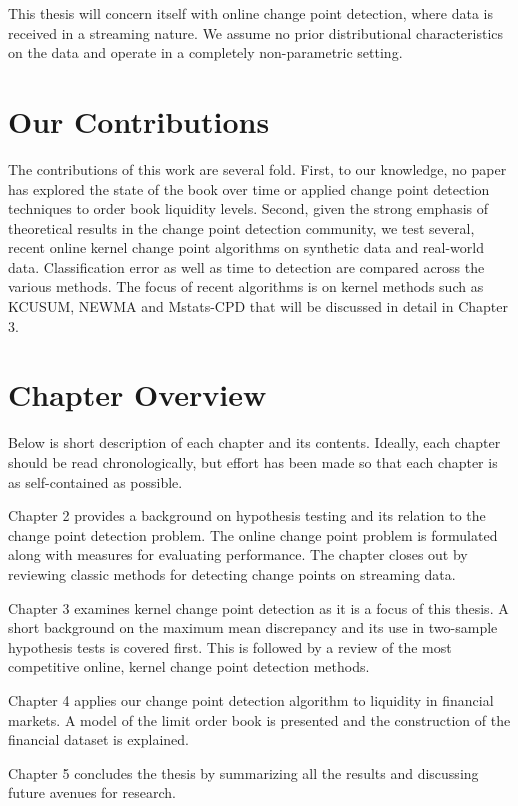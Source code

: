 This thesis will concern itself with online change point detection, where data is received in a streaming nature. We assume no prior distributional characteristics on the data and operate in a completely non-parametric setting. 


\section{Our Contributions}
The contributions of this work are several fold. First, to our knowledge, no paper has explored the state of the book over time or applied change point detection techniques to order book liquidity levels. Second, given the strong emphasis of theoretical results in the change point detection community, we test several, recent online kernel change point algorithms on synthetic data and real-world data. Classification error as well as time to detection are compared across the various methods. The focus of recent algorithms is on kernel methods such as KCUSUM, NEWMA and Mstats-CPD that will be discussed in detail in Chapter 3.

\section{Chapter Overview}
Below is short description of each chapter and its contents. Ideally, each chapter should be read chronologically, but effort has been made so that each chapter is as self-contained as possible.

Chapter 2 provides a background on hypothesis testing and its relation to the change point detection problem. The online change point problem is formulated along with measures for evaluating performance. The chapter closes out by reviewing classic methods for detecting change points on streaming data.

Chapter 3 examines kernel change point detection as it is a focus of this thesis. A short background on the maximum mean discrepancy and its use in two-sample hypothesis tests is covered first. This is followed by a review of the most competitive online, kernel change point detection methods.

Chapter 4 applies our change point detection algorithm to liquidity in financial markets. A model of the limit order book is presented and the construction of the financial dataset is explained.

Chapter 5 concludes the thesis by summarizing all the results and discussing future avenues for research.